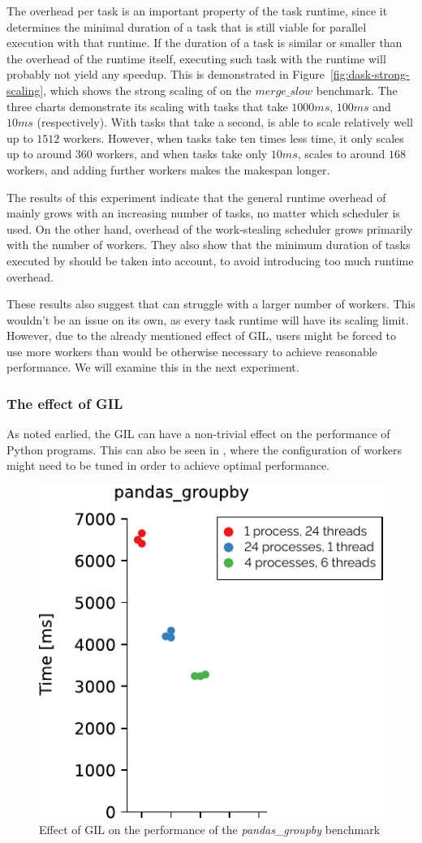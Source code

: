 The overhead per task is an important property of the task runtime, since it determines the minimal
duration of a task that is still viable for parallel execution with that runtime. If the duration
of a task is similar or smaller than the overhead of the runtime itself, executing such task with
the runtime will probably not yield any speedup. This is demonstrated in
Figure~\ref{fig:dask-strong-scaling}, which shows the strong scaling of \dask{}
on the $merge\_slow$ benchmark. The three charts demonstrate its scaling with tasks
that take $1000ms$, $100ms$ and $10ms$
(respectively). With tasks that take a second, \dask{} is able to scale
relatively well up to $1512$ workers. However, when tasks take ten times less
time, it only scales up to around $360$ workers, and when tasks take only
$10ms$, \dask{} scales to around $168$
workers, and adding further workers makes the makespan longer.

The results of this experiment indicate that the general runtime overhead of
\dask{} mainly grows with an increasing number of tasks, no matter which
scheduler is used. On the other hand, overhead of the work-stealing scheduler grows primarily with
the number of workers. They also show that the minimum duration of tasks executed by
\dask{} should be taken into account, to avoid introducing too much runtime
overhead.

These results also suggest that \dask{} can struggle with a larger number of
workers. This wouldn't be an issue on its own, as every task runtime will have its scaling limit.
However, due to the already mentioned effect of GIL, \dask{} users might be
forced to use more workers than would be otherwise necessary to achieve reasonable performance. We
will examine this in the next experiment.

\subsubsection*{The effect of GIL}
As noted earlied, the GIL can have a non-trivial effect on the performance of Python programs. This
can also be seen in \dask{}, where the configuration of workers might need to
be tuned in order to achieve optimal performance.

\begin{figure}
	\centering
	\includegraphics[width=0.3\linewidth]{./imgs/rsds/charts/dask-gil-scaling}
	\caption{Effect of GIL on the performance of the \emph{pandas\_groupby} benchmark}
	\label{fig:dask-gil-scaling}
\end{figure}

